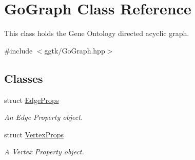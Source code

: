 \hypertarget{classGoGraph}{}\section{Go\+Graph Class Reference}
\label{classGoGraph}


This class holds the Gene Ontology directed acyclic graph.  




{\ttfamily \#include $<$ggtk/\+Go\+Graph.\+hpp$>$}

\subsection*{Classes}
\begin{DoxyCompactItemize}
\item 
struct \hyperlink{structGoGraph_1_1EdgeProps}{Edge\+Props}
\begin{DoxyCompactList}\small\item\em An Edge Property object. \end{DoxyCompactList}\item 
struct \hyperlink{structGoGraph_1_1VertexProps}{Vertex\+Props}
\begin{DoxyCompactList}\small\item\em A Vertex Property object. \end{DoxyCompactList}\end{DoxyCompactItemize}
